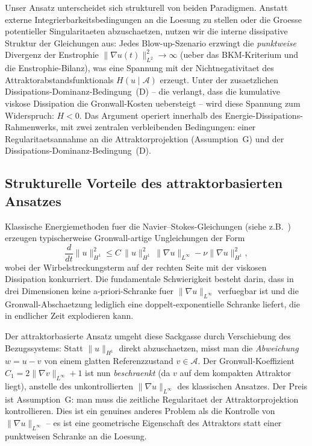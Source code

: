 \documentclass[12pt,a4paper]{article}
\theoremstyle{definition}
\theoremstyle{plain}
\theoremstyle{remark}
\begin{document}
Unser Ansatz unterscheidet sich strukturell von beiden Paradigmen. Anstatt externe Integrierbarkeitsbedingungen an die Loesung zu stellen oder die Groesse potentieller Singularitaeten abzuschaetzen, nutzen wir die interne dissipative Struktur der Gleichungen aus: Jedes Blow-up-Szenario erzwingt die \emph{punktweise} Divergenz der Enstrophie $\|\nabla u(t)\|_{L^2}^2 \to \infty$ (ueber das BKM-Kriterium und die Enstrophie-Bilanz), was eine Spannung mit der Nichtnegativitaet des Attraktorabstandsfunktionals $H(u \mid \mathcal{A})$ erzeugt. Unter der zusaetzlichen Dissipations-Dominanz-Bedingung~(D) -- die verlangt, dass die kumulative viskose Dissipation die Gronwall-Kosten uebersteigt -- wird diese Spannung zum Widerspruch: $H < 0$. Das Argument operiert innerhalb des Energie-Dissipations-Rahmenwerks, mit zwei zentralen verbleibenden Bedingungen: einer Regularitaetsannahme an die Attraktorprojektion (Assumption~G) und der Dissipations-Dominanz-Bedingung~(D).

\subsection{Strukturelle Vorteile des attraktorbasierten Ansatzes}

Klassische Energiemethoden fuer die Navier--Stokes-Gleichungen (siehe z.B.\ \cite{ConstantinFoias1988,Temam2001}) erzeugen typischerweise Gronwall-artige Ungleichungen der Form
\[
    \frac{d}{dt}\|u\|_{H^1}^2 \le C\,\|u\|_{H^1}^2\,\|\nabla u\|_{L^\infty} - \nu\|\nabla u\|_{H^1}^2,
\]
wobei der Wirbelstreckungsterm auf der rechten Seite mit der viskosen Dissipation konkurriert. Die fundamentale Schwierigkeit besteht darin, dass in drei Dimensionen keine a-priori-Schranke fuer $\|\nabla u\|_{L^\infty}$ verfuegbar ist und die Gronwall-Abschaetzung lediglich eine doppelt-exponentielle Schranke liefert, die in endlicher Zeit explodieren kann.

Der attraktorbasierte Ansatz umgeht diese Sackgasse durch Verschiebung des Bezugssystems: Statt $\|u\|_{H^1}$ direkt abzuschaetzen, misst man die \emph{Abweichung} $w = u - v$ von einem glatten Referenzzustand $v \in \mathcal{A}$. Der Gronwall-Koeffizient $C_1 = 2\|\nabla v\|_{L^\infty} + 1$ ist nun \emph{beschraenkt} (da $v$ auf dem kompakten Attraktor liegt), anstelle des unkontrollierten $\|\nabla u\|_{L^\infty}$ des klassischen Ansatzes. Der Preis ist Assumption~G: man muss die zeitliche Regularitaet der Attraktorprojektion kontrollieren. Dies ist ein genuines anderes Problem als die Kontrolle von $\|\nabla u\|_{L^\infty}$ -- es ist eine geometrische Eigenschaft des Attraktors statt einer punktweisen Schranke an die Loesung.
\end{document}
